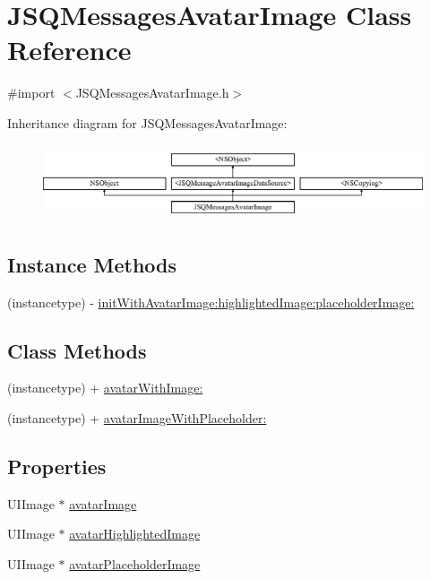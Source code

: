 \hypertarget{interface_j_s_q_messages_avatar_image}{}\section{J\+S\+Q\+Messages\+Avatar\+Image Class Reference}
\label{interface_j_s_q_messages_avatar_image}


{\ttfamily \#import $<$J\+S\+Q\+Messages\+Avatar\+Image.\+h$>$}

Inheritance diagram for J\+S\+Q\+Messages\+Avatar\+Image\+:\begin{figure}[H]
\begin{center}
\leavevmode
\includegraphics[height=2.258065cm]{interface_j_s_q_messages_avatar_image}
\end{center}
\end{figure}
\subsection*{Instance Methods}
\begin{DoxyCompactItemize}
\item 
(instancetype) -\/ \hyperlink{interface_j_s_q_messages_avatar_image_a7444dae666973a8a91063f901ba053e7}{init\+With\+Avatar\+Image\+:highlighted\+Image\+:placeholder\+Image\+:}
\end{DoxyCompactItemize}
\subsection*{Class Methods}
\begin{DoxyCompactItemize}
\item 
(instancetype) + \hyperlink{interface_j_s_q_messages_avatar_image_ae5e78d7592cf872ed94b6ca34fef3c75}{avatar\+With\+Image\+:}
\item 
(instancetype) + \hyperlink{interface_j_s_q_messages_avatar_image_a2aef05dbb0b21cdf09ea8c06de2d3e52}{avatar\+Image\+With\+Placeholder\+:}
\end{DoxyCompactItemize}
\subsection*{Properties}
\begin{DoxyCompactItemize}
\item 
U\+I\+Image $\ast$ \hyperlink{interface_j_s_q_messages_avatar_image_a2ea2e501b24e9de35d362876354b4e1e}{avatar\+Image}
\item 
U\+I\+Image $\ast$ \hyperlink{interface_j_s_q_messages_avatar_image_a6941633ed19114faf0a98588925cf991}{avatar\+Highlighted\+Image}
\item 
U\+I\+Image $\ast$ \hyperlink{interface_j_s_q_messages_avatar_image_aede18829f8117a9d0116215e91163577}{avatar\+Placeholder\+Image}
\end{DoxyCompactItemize}


